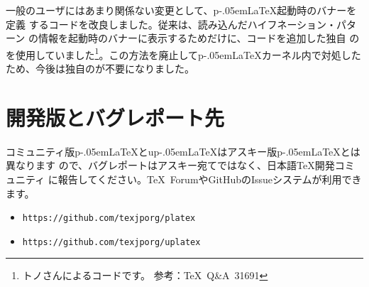 \documentclass{plnews}
\def\pLaTeX{p\kern-.05em\LaTeX}
\begin{document}
一般のユーザにはあまり関係ない変更として、\pLaTeX{}起動時のバナーを定義
するコードを改良しました。従来は、読み込んだハイフネーション・パターン
の情報を起動時のバナーに表示するためだけに、コードを追加した独自
のを使用していました\footnote{トノさんによるコードです。
参考：\TeX\ Q\&A~31691}。この方法を廃止して\pLaTeX{}カーネル内で対処した
ため、今後は独自のが不要になりました。


\section{開発版とバグレポート先}
コミュニティ版\pLaTeX{}とu\pLaTeX{}はアスキー版\pLaTeX{}とは異なります
ので、バグレポートはアスキー宛てではなく、日本語\TeX{}開発コミュニティ
に報告してください。\TeX\ ForumやGitHubのIssueシステムが利用できます。
\begin{itemize}
\item \texttt{https://github.com/texjporg/platex}
\item \texttt{https://github.com/texjporg/uplatex}
\end{itemize}
\end{document}
